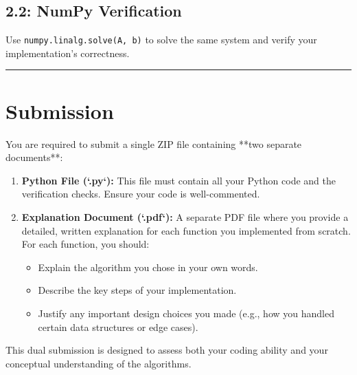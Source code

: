 \documentclass[12pt]{article}
\begin{document}
\subsection*{2.2: NumPy Verification}
Use \texttt{numpy.linalg.solve(A, b)} to solve the same system and verify your implementation's correctness.

\vspace{2em}
\hrule
\section*{Submission}

You are required to submit a single ZIP file containing **two separate documents**:

\begin{enumerate}
    \item \textbf{Python File (`.py`):} This file must contain all your Python code and the verification checks. Ensure your code is well-commented.
    
    \item \textbf{Explanation Document (`.pdf`):} A separate PDF file where you provide a detailed, written explanation for each function you implemented from scratch. For each function, you should:
    \begin{itemize}
        \item Explain the algorithm you chose in your own words.
        \item Describe the key steps of your implementation.
        \item Justify any important design choices you made (e.g., how you handled certain data structures or edge cases).
    \end{itemize}
\end{enumerate}

This dual submission is designed to assess both your coding ability and your conceptual understanding of the algorithms.
\end{document}
